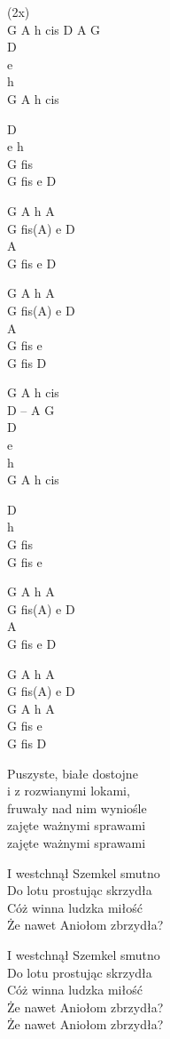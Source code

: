 \begin{chord}
    (2x)\\
    G A h cis D A G\\
    D\\
    e\\
    h\\
    G A h cis

    D\\
    e h\\
    G fis\\
    G fis e D

    \OneColVin G A h A\\
    \OneColVin G fis(A) e D\\
    \OneColVin A\\
    \OneColVin G fis e D

    \OneColVin G A h A\\
    \OneColVin G fis(A) e D\\
    \OneColVin A\\
    \OneColVin G fis e\\
    \OneColVin G fis D

    G A h cis\ifOneCol \else \\ \fi D – A G\\
    D\\
    e\\
    h\\
    G A h cis

    D\\
    h\\
    G fis\\
    G fis e

    \OneColVin G A h A\\
    \OneColVin G fis(A) e D\\
    \OneColVin A\\
    \OneColVin G fis e D

    \OneColVin G A h A\\
    \OneColVin G fis(A) e D\\
    \OneColVin G A h A\\
    \OneColVin G fis e\\
    \OneColVin G fis D
\end{chord}
\TwelvePage
\begin{text}
Puszyste, białe dostojne\\
i z rozwianymi lokami,\\
fruwały nad nim wyniośle\\
zajęte ważnymi sprawami\\
zajęte ważnymi sprawami

\vin I westchnął Szemkel smutno\\
\vin Do lotu prostując skrzydła\\
\vin Cóż winna ludzka miłość\\
\vin Że nawet Aniołom zbrzydła?

\vin I westchnął Szemkel smutno\\
\vin Do lotu prostując skrzydła\\
\vin Cóż winna ludzka miłość\\
\vin Że nawet Aniołom zbrzydła?\\
\vin Że nawet Aniołom zbrzydła?
\end{text}

